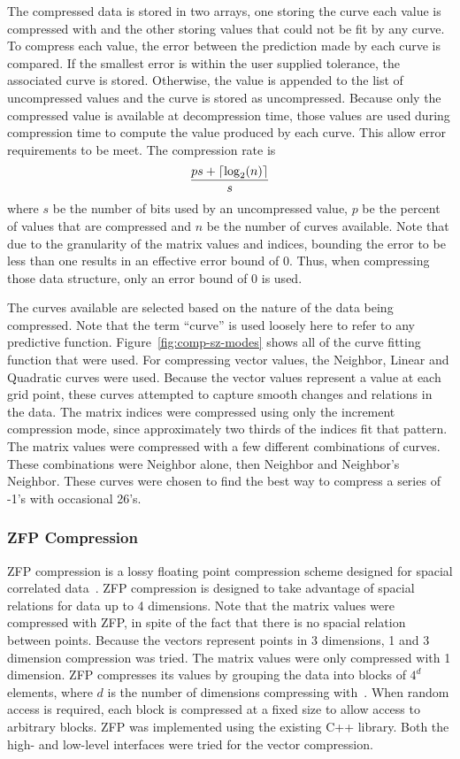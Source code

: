 The compressed data is stored in two arrays, one storing the curve each value is compressed with and the other storing values that could not be fit by any curve.
To compress each value, the error between the prediction made by each curve is compared.
If the smallest error is within the user supplied tolerance, the associated curve is stored.
Otherwise, the value is appended to the list of uncompressed values and the curve is stored as uncompressed.
Because only the compressed value is available at decompression time, those values are used during compression time to compute the value produced by each curve.
This allow error requirements to be meet.
The compression rate is
\[
	\frac{ps+\lceil\log_2(n)\rceil}{s}
\]
where \(s\) be the number of bits used by an uncompressed value, \(p\) be the percent of values that are compressed and \(n\) be the number of curves available.
Note that due to the granularity of the matrix values and indices, bounding the error to be less than one results in an effective error bound of 0.
Thus, when compressing those data structure, only an error bound of 0 is used.



The curves available are selected based on the nature of the data being compressed.
Note that the term ``curve'' is used loosely here to refer to any predictive function.
Figure~\ref{fig:comp-sz-modes} shows all of the curve fitting function that were used.
For compressing vector values, the Neighbor, Linear and Quadratic curves were used.
Because the vector values represent a value at each grid point, these curves attempted to capture smooth changes and relations in the data.
The matrix indices were compressed using only the increment compression mode, since approximately two thirds of the indices fit that pattern.
The matrix values were compressed with a few different combinations of curves.
These combinations were Neighbor alone, then Neighbor and Neighbor's Neighbor.
These curves were chosen to find the best way to compress a series of -1's with occasional 26's.

\subsubsection{ZFP Compression}
ZFP compression is a lossy floating point compression scheme designed for spacial correlated data~\cite{Lindstrom:2014:zfp}.
ZFP compression is designed to take advantage of spacial relations for data up to 4 dimensions.
Note that the matrix values were compressed with ZFP, in spite of the fact that there is no spacial relation between points.
Because the vectors represent points in 3 dimensions, 1 and 3 dimension compression was tried.
The matrix values were only compressed with 1 dimension.
ZFP compresses its values by grouping the data into blocks of \(4^d\) elements, where \(d\) is the number of dimensions compressing with~\cite{Lindstrom:2014:zfp}.
When random access is required, each block is compressed at a fixed size to allow access to arbitrary blocks.
ZFP was implemented using the existing C++ library.
Both the high- and low-level interfaces were tried for the vector compression.


